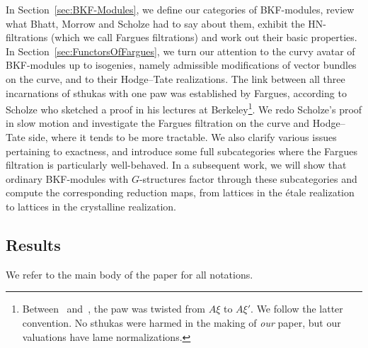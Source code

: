 In Section~\ref{sec:BKF-Modules}, we define our categories of BKF-modules, review what Bhatt, Morrow and Scholze had to say about them, exhibit the HN-filtrations (which we call Fargues filtrations) and work out their basic properties. In Section~\ref{sec:FunctorsOfFargues}, we turn our attention to the curvy avatar of BKF-modules up to isogenies, namely admissible modifications of vector bundles on the curve, and to their Hodge--Tate realizations. The link between all three incarnations of sthukas with one paw was established by Fargues, according to Scholze who sketched a proof in his lectures at Berkeley\footnote{Between~\cite{ScWe15} and~\cite{BaMoSc16}, the paw was twisted from $A\xi$ to $A\xi'$. We follow the latter convention. No sthukas were harmed in the making of \emph{our} paper, but our valuations have lame normalizations. }. We redo Scholze's proof in slow motion and investigate the Fargues filtration on the curve and Hodge--Tate side, where it tends to be more tractable. We also clarify various issues pertaining to exactness, and introduce some full subcategories where the Fargues filtration is particularly well-behaved. In a subsequent work, we will show that ordinary BKF-modules with $G$-structures factor through these subcategories and compute the corresponding reduction maps, from lattices in the \'etale realization to lattices in the crystalline realization.

\subsection{Results}

We refer to the main body of the paper for all notations.

